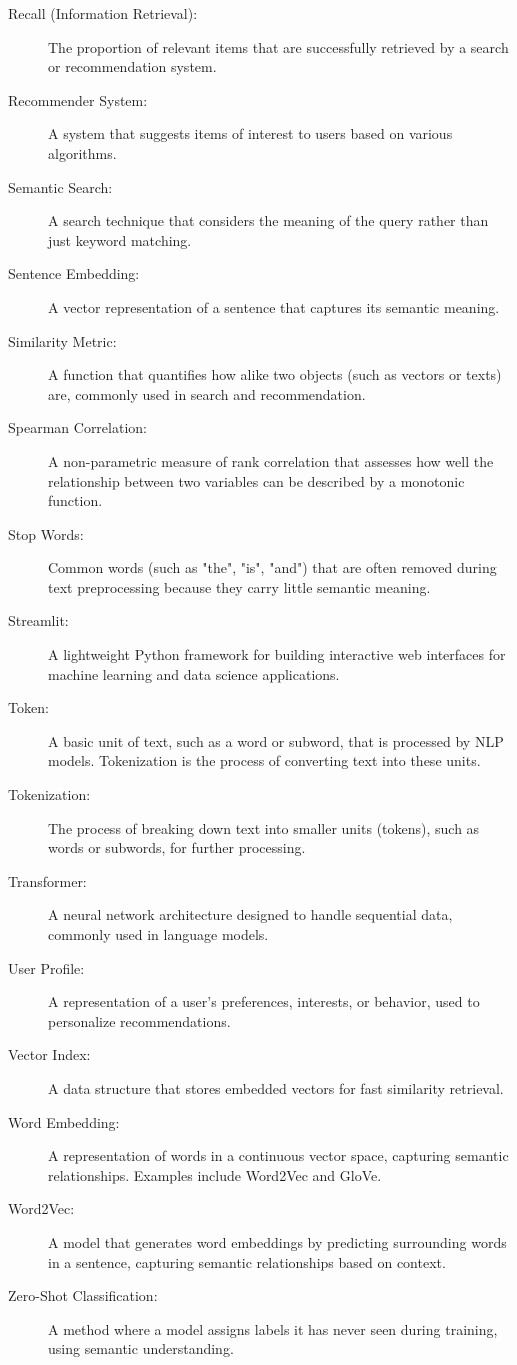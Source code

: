 \begin{description}
    \item[Recall (Information Retrieval):] The proportion of relevant items that are successfully retrieved by a search or recommendation system.
    \item[Recommender System:] A system that suggests items of interest to users based on various algorithms.
    \item[Semantic Search:] A search technique that considers the meaning of the query rather than just keyword matching.
    \item[Sentence Embedding:] A vector representation of a sentence that captures its semantic meaning.
    \item[Similarity Metric:] A function that quantifies how alike two objects (such as vectors or texts) are, commonly used in search and recommendation.
    \item[Spearman Correlation:] A non-parametric measure of rank correlation that assesses how well the relationship between two variables can be described by a monotonic function.
    \item[Stop Words:] Common words (such as "the", "is", "and") that are often removed during text preprocessing because they carry little semantic meaning.
    \item[Streamlit:] A lightweight Python framework for building interactive web interfaces for machine learning and data science applications.
    \item[Token:] A basic unit of text, such as a word or subword, that is processed by NLP models. Tokenization is the process of converting text into these units. 
    \item[Tokenization:] The process of breaking down text into smaller units (tokens), such as words or subwords, for further processing.
    \item[Transformer:] A neural network architecture designed to handle sequential data, commonly used in language models.
    \item[User Profile:] A representation of a user's preferences, interests, or behavior, used to personalize recommendations.
    \item[Vector Index:] A data structure that stores embedded vectors for fast similarity retrieval.
    \item[Word Embedding:] A representation of words in a continuous vector space, capturing semantic relationships. Examples include Word2Vec and GloVe.
    \item[Word2Vec:] A model that generates word embeddings by predicting surrounding words in a sentence, capturing semantic relationships based on context.
    \item[Zero-Shot Classification:] A method where a model assigns labels it has never seen during training, using semantic understanding.
\end{description}

